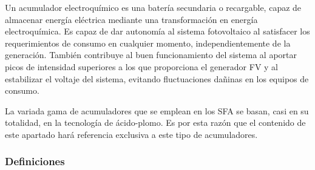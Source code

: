Un acumulador electroquímico es una batería secundaria o recargable,
capaz de almacenar energía eléctrica mediante una transformación en
energía electroquímica. Es capaz de dar autonomía al sistema fotovoltaico
al satisfacer los requerimientos de consumo en cualquier momento,
independientemente de la generación. También contribuye al buen funcionamiento
del sistema al aportar picos de intensidad superiores a los que proporciona
el generador FV y al estabilizar el voltaje del sistema, evitando
fluctuaciones dañinas en los equipos de consumo. 

La variada gama de acumuladores que se emplean en los SFA se basan,
casi en su totalidad, en la tecnología de ácido-plomo. Es por esta
razón que el contenido de este apartado hará referencia exclusiva
a este tipo de acumuladores.


\subsubsection{Definiciones}

